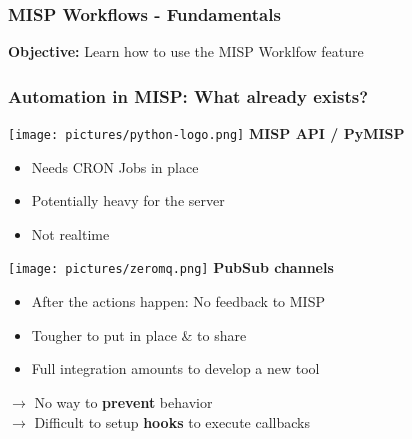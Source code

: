 \begin{frame}
    \frametitle{
        \huge
        MISP Workflows - Fundamentals
        \vspace{1em}
    }
    \textbf{Objective:} Learn how to use the MISP Worklfow feature
\end{frame}

\begin{frame}
    \frametitle{Automation in MISP: What already exists?}
    \texttt{[image: pictures/python-logo.png]}\hspace*{0.5em} \textbf{MISP API / PyMISP}
    \hspace*{0.25em}
    \begin{itemize}
        \item Needs CRON Jobs in place
        \item Potentially heavy for the server
        \item Not realtime
    \end{itemize}
    \vspace*{1em}
    \texttt{[image: pictures/zeromq.png]}\hspace*{0.5em} \textbf{PubSub channels}
    \hspace*{0.25em}
    \begin{itemize}
        \item After the actions happen: No feedback to MISP
        \item Tougher to put in place \& to share
        \item Full integration amounts to develop a new tool
    \end{itemize}
    \vspace*{0.5em}
    $\rightarrow$ No way to \textbf{prevent} behavior\\
    $\rightarrow$ Difficult to setup \textbf{hooks} to execute callbacks
\end{frame}

